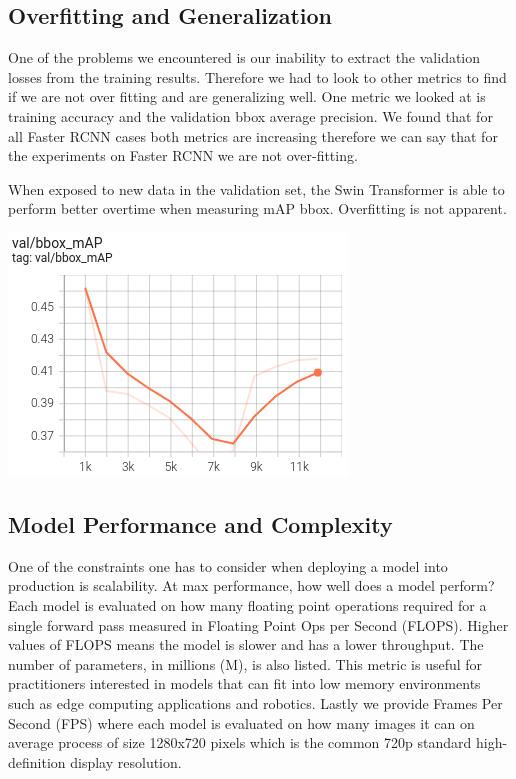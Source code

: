 \documentclass[10pt,twocolumn,letterpaper]{article}
\begin{document}
\subsection{Overfitting and Generalization}

One of the problems we encountered is our inability to extract the validation losses from the training results. Therefore we had to look to other metrics to find if we are not over fitting and are generalizing well. One metric we looked at is training accuracy and the validation bbox average precision. We found that for all Faster RCNN cases both metrics are increasing therefore we can say that for the experiments on Faster RCNN we are not over-fitting. 

When exposed to new data in the validation set, the Swin Transformer is able to perform better overtime when measuring mAP bbox. Overfitting is not apparent.

\includegraphics[width=0.8\linewidth]{docs/latex/images/brandon/swin_val_loss_bbox.png}

\subsection{Model Performance and Complexity}

One of the constraints one has to consider when deploying a model into production is scalability. At max performance, how well does a model perform? Each model is evaluated on how many floating point operations required for a single forward pass measured in Floating Point Ops per Second (FLOPS). Higher values of FLOPS means the model is slower and has a lower throughput. The number of parameters, in millions (M), is also listed. This metric is useful for practitioners interested in models that can fit into low memory environments such as edge computing applications and robotics. Lastly we provide Frames Per Second (FPS) where each model is evaluated on how many images it can on average process of size 1280x720 pixels which is the common 720p standard high-definition display resolution.
\end{document}

